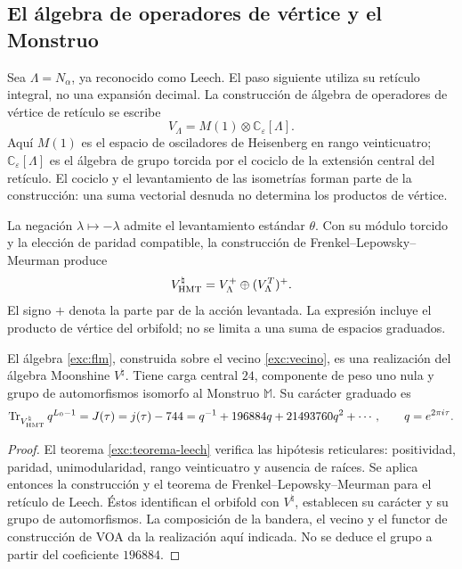 \subsection{El álgebra de operadores de vértice y el Monstruo}
\label{exc:voa}

Sea $\Lambda=N_\alpha$, ya reconocido como Leech. El paso siguiente
utiliza su retículo integral, no una expansión decimal. La construcción
de álgebra de operadores de vértice de retículo se escribe
\[
 V_\Lambda=M(1)\otimes\mathbb C_\varepsilon[\Lambda].
\]
Aquí $M(1)$ es el espacio de osciladores de Heisenberg en rango
veinticuatro; $\mathbb C_\varepsilon[\Lambda]$ es el álgebra de grupo
torcida por el cociclo de la extensión central del retículo. El
cociclo y el levantamiento de las isometrías forman parte de la
construcción: una suma vectorial desnuda no determina los productos
de vértice.

La negación $\lambda\mapsto-\lambda$ admite el levantamiento estándar
$\theta$. Con su módulo torcido y la elección de paridad compatible,
la construcción de Frenkel--Lepowsky--Meurman produce
\begin{equation}
 V^\natural_{\rm HMT}
   =V_\Lambda^+\oplus(V_\Lambda^T)^+.
 \label{exc:flm}
\end{equation}
El signo $+$ denota la parte par de la acción levantada. La expresión
incluye el producto de vértice del orbifold; no se limita a una suma
de espacios graduados.

\begin{theorem}
\label{exc:moonshine}
El álgebra \eqref{exc:flm}, construida sobre el vecino
\eqref{exc:vecino}, es una realización del álgebra Moonshine
$V^\natural$. Tiene carga central $24$, componente de peso uno nula
y grupo de automorfismos isomorfo al Monstruo $\mathbb M$. Su carácter
graduado es
\begin{equation}
 \operatorname{Tr}_{V^\natural_{\rm HMT}}q^{L_0-1}
   =J(\tau)=j(\tau)-744
   =q^{-1}+196884q+21493760q^2+\cdots,
 \qquad q=e^{2\pi i\tau}.
 \label{exc:j}
\end{equation}
\end{theorem}

\begin{proof}
El teorema \ref{exc:teorema-leech} verifica las hipótesis reticulares:
positividad, paridad, unimodularidad, rango veinticuatro y ausencia de
raíces. Se aplica entonces la construcción y el teorema de
Frenkel--Lepowsky--Meurman para el retículo de Leech. Éstos identifican
el orbifold con $V^\natural$, establecen su carácter y su grupo de
automorfismos. La composición de la bandera, el vecino y el functor
de construcción de VOA da la realización aquí indicada. No se deduce
el grupo a partir del coeficiente $196884$.
\end{proof}

